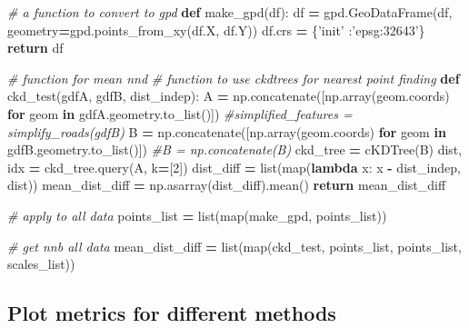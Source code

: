 \documentclass[]{article}
\newenvironment{Shaded}{\begin{snugshade}}{\end{snugshade}}
\newcommand{\BuiltInTok}[1]{#1}
\newcommand{\CommentTok}[1]{\textcolor[rgb]{0.56,0.35,0.01}{\textit{#1}}}
\newcommand{\ControlFlowTok}[1]{\textcolor[rgb]{0.13,0.29,0.53}{\textbf{#1}}}
\newcommand{\DecValTok}[1]{\textcolor[rgb]{0.00,0.00,0.81}{#1}}
\newcommand{\KeywordTok}[1]{\textcolor[rgb]{0.13,0.29,0.53}{\textbf{#1}}}
\newcommand{\NormalTok}[1]{#1}
\newcommand{\OperatorTok}[1]{\textcolor[rgb]{0.81,0.36,0.00}{\textbf{#1}}}
\newcommand{\StringTok}[1]{\textcolor[rgb]{0.31,0.60,0.02}{#1}}
\begin{document}
\begin{Shaded}
\begin{Highlighting}[numbers=left,,]
\CommentTok{# a function to convert to gpd}
\KeywordTok{def}\NormalTok{ make_gpd(df):}
\NormalTok{    df }\OperatorTok{=}\NormalTok{ gpd.GeoDataFrame(df, geometry}\OperatorTok{=}\NormalTok{gpd.points_from_xy(df.X, df.Y))}
\NormalTok{    df.crs }\OperatorTok{=}\NormalTok{ \{}\StringTok{'init'}\NormalTok{ :}\StringTok{'epsg:32643'}\NormalTok{\}}
    \ControlFlowTok{return}\NormalTok{ df}


\CommentTok{# function for mean nnd}
\CommentTok{# function to use ckdtrees for nearest point finding}
\KeywordTok{def}\NormalTok{ ckd_test(gdfA, gdfB, dist_indep):}
\NormalTok{    A }\OperatorTok{=}\NormalTok{ np.concatenate([np.array(geom.coords) }\ControlFlowTok{for}\NormalTok{ geom }\KeywordTok{in}\NormalTok{ gdfA.geometry.to_list()])}
    \CommentTok{#simplified_features = simplify_roads(gdfB)}
\NormalTok{    B }\OperatorTok{=}\NormalTok{ np.concatenate([np.array(geom.coords) }\ControlFlowTok{for}\NormalTok{ geom }\KeywordTok{in}\NormalTok{ gdfB.geometry.to_list()])}
    \CommentTok{#B = np.concatenate(B)}
\NormalTok{    ckd_tree }\OperatorTok{=}\NormalTok{ cKDTree(B)}
\NormalTok{    dist, idx }\OperatorTok{=}\NormalTok{ ckd_tree.query(A, k}\OperatorTok{=}\NormalTok{[}\DecValTok{2}\NormalTok{])}
\NormalTok{    dist_diff }\OperatorTok{=} \BuiltInTok{list}\NormalTok{(}\BuiltInTok{map}\NormalTok{(}\KeywordTok{lambda}\NormalTok{ x: x }\OperatorTok{-}\NormalTok{ dist_indep, dist))}
\NormalTok{    mean_dist_diff }\OperatorTok{=}\NormalTok{ np.asarray(dist_diff).mean()}
    \ControlFlowTok{return}\NormalTok{ mean_dist_diff}


\CommentTok{# apply to all data}
\NormalTok{points_list }\OperatorTok{=} \BuiltInTok{list}\NormalTok{(}\BuiltInTok{map}\NormalTok{(make_gpd, points_list))}

\CommentTok{# get nnb all data}
\NormalTok{mean_dist_diff }\OperatorTok{=} \BuiltInTok{list}\NormalTok{(}\BuiltInTok{map}\NormalTok{(ckd_test, points_list, points_list, scales_list))}
\end{Highlighting}
\end{Shaded}

\hypertarget{plot-metrics-for-different-methods}{%
\subsection{Plot metrics for different methods}\label{plot-metrics-for-different-methods}}
\end{document}
